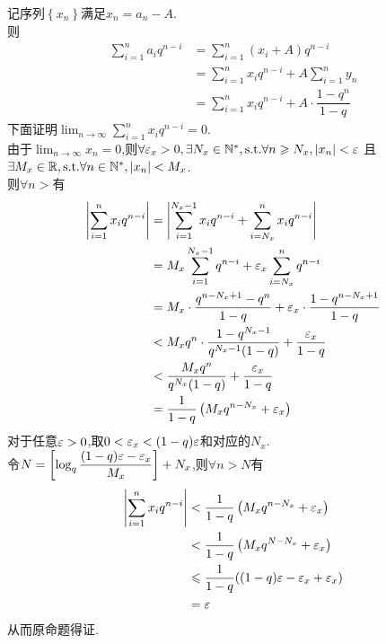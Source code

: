 \documentclass{ctexart}
\begin{document}
\begin{solution}[Proof.]
    记序列$\left\{ x_n\right\}$满足$x_n=a_n-A$.\\
    则$$\begin{aligned}
        \sum_{i=1}^{n}{a_iq^{n-i}} 
        &= \sum_{i=1}^{n}{(x_i+A)q^{n-i}} \\
        &= \sum_{i=1}^{n}{x_iq^{n-i}}+A\sum_{i=1}^{n}{y_n} \\
        &= \sum_{i=1}^{n}{x_iq^{n-i}}+A\cdot\dfrac{1-q^n}{1-q}
    \end{aligned}$$
    下面证明$\displaystyle\lim_{n\to\infty}{\sum_{i=1}^{n}{x_iq^{n-i}}}=0$.\\
    由于$\displaystyle\lim_{n\to\infty}{x_n}=0$,则$\forall\varepsilon_x>0,\exists N_x\in\mathbb{N}^*,\text{s.t.}\forall n\geqslant N_x,\left|x_n\right|<\varepsilon$
    且$\exists M_x\in\mathbb{R},\text{s.t.}\forall n\in\mathbb{N}^*,\left|x_n\right|<M_x$.\\
    则$\forall n>$有
    \begin{align*}
        \left|\sum_{i=1}^{n}{x_iq^{n-i}}\right|
        &= \left|\sum_{i=1}^{N_x-1}{x_iq^{n-i}}+\sum_{i=N_x}^{n}{x_iq^{n-i}}\right| \\
        &= M_x\sum_{i=1}^{N_x-1}{q^{n-i}}+\varepsilon_x\sum_{i=N_x}^{n}{q^{n-i}} \\
        &= M_x\cdot\dfrac{q^{n-N_x+1}-q^n}{1-q}+\varepsilon_x\cdot\dfrac{1-q^{n-N_x+1}}{1-q} \\
        &< M_xq^n\cdot\dfrac{1-q^{N_x-1}}{q^{N_x-1}(1-q)}+\dfrac{\varepsilon_x}{1-q} \\
        &< \dfrac{M_xq^n}{q^{N_x}(1-q)}+\dfrac{\varepsilon_x}{1-q} \\
        &= \dfrac{1}{1-q}\left(M_xq^{n-N_x}+\varepsilon_x\right)
    \end{align*}
    对于任意$\varepsilon>0$,取$0<\varepsilon_x<(1-q)\varepsilon$和对应的$N_x$.\\
    令$N=\left[\log_q{\dfrac{(1-q)\varepsilon-\varepsilon_x}{M_x}}\right]+N_x$,则$\forall n>N$有
    \begin{align*}
        \left|\sum_{i=1}^{n}{x_iq^{n-i}}\right|
        &< \dfrac{1}{1-q}\left(M_xq^{n-N_x}+\varepsilon_x\right) \\
        &< \dfrac{1}{1-q}\left(M_xq^{N-N_x}+\varepsilon_x\right) \\
        &\leqslant \dfrac{1}{1-q}((1-q)\varepsilon-\varepsilon_x+\varepsilon_x) \\
        &= \varepsilon
    \end{align*}
    从而原命题得证.
\end{solution}
\end{document}
